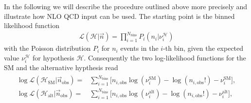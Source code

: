 \documentclass[preprint]{JHEP3}
\newcommand{\SM}{\mathrm{SM}}
\newcommand{\alt}{\mathrm{alt}}
\def\HSM{\mathcal{H}_{\mathrm{SM}}}
\def\Halt{\mathcal{H}_{\mathrm{alt}}}
\newcommand{\be}{\begin{eqnarray}}
\newcommand{\ee}{\end{eqnarray}}
\begin{document}
In the following we will describe the procedure outlined above more precisely and illustrate how NLO QCD input can be used.
The starting point is the binned likelihood function 
\be
\label{lili}
   \mathcal{L}(\mathcal{H}|\vec{n}) = \prod_{i=1}^{N_\mathrm{bins}} P_i(n_i|\nu_{i}^\mathcal{H})
\ee
with the Poisson distribution $P_i$ for $n_i$ events in the $i$-th bin, given the expected value $\nu_{i}^\mathcal{H}$ for hypothesis $\mathcal{H}$. 
Consequently the two log-likelihood functions for the SM and the alternative hypthesis read
\be
\label{lilifunct}
\begin{split}
  \log\mathcal{L}(\HSM |\vec{n}_\mathrm{obs})  =& \sum_{i=1}^{N_\mathrm{bins}} \bigl[ n_{i,\mathrm{obs}}\log(\nu_i^{\SM}) -\log(n_{i,\mathrm{obs}}!) -\nu_i^{\SM}  \bigr], \\
  \log\mathcal{L}(\Halt|\vec{n}_\mathrm{obs})  =& \sum_{i=1}^{N_\mathrm{bins}} \bigl[ n_{i,\mathrm{obs}}\log(\nu_i^{\alt})-\log(n_{i,\mathrm{obs}}!) -\nu_i^{\alt} \bigr],
\end{split}
\ee
\end{document}
